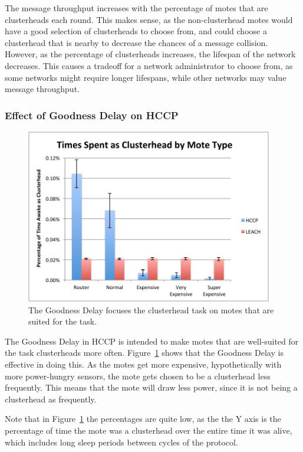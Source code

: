 The message throughput increases with the percentage of motes that are clusterheads each round. This makes sense,
as the non-clusterhead motes would have a good selection of clusterheads to choose from, and could choose a
clusterhead that is nearby to decrease the chances of a message collision. However, as the percentage of clusterheads
increases, the lifespan of the network decreases. This causes a tradeoff for a network administrator to choose from, 
as some networks might require longer lifespans, while other networks may value message throughput.

\subsubsection{Effect of Goodness Delay on HCCP}

\begin{figure}[htbp]
    \centering
        \includegraphics[height=3in]{images/clusterheadChoice/SensorMissionCHTime.pdf}
    \caption{The Goodness Delay focuses the clusterhead task on motes that are suited for the task.}
    \label{fig:images_clusterheadChoice_SensorMissionCHTime}
\end{figure}

The Goodness Delay in HCCP is intended to make motes that are well-suited for the task
clusterheads more often. Figure~\ref{fig:images_clusterheadChoice_SensorMissionCHTime} shows
that the Goodness Delay is effective in doing this. As the motes get more expensive, hypothetically
with more power-hungry sensors, the mote gets chosen to be a clusterhead less frequently. This means that 
the mote will draw less power, since it is not being a clusterhead as frequently. 

Note that in Figure~\ref{fig:images_clusterheadChoice_SensorMissionCHTime} the percentages are quite low, as
the the Y axis is the percentage of time  the mote was a clusterhead over the entire
time it was alive, which includes long sleep periods between cycles of the protocol.



